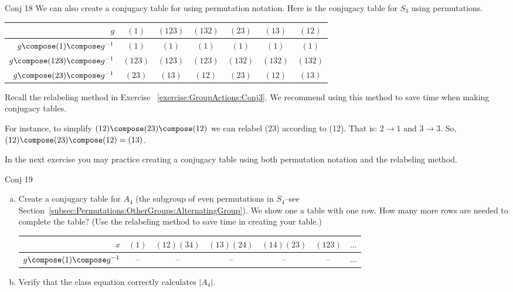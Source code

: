 \begin{example}{Conj 18}
We can also create a conjugacy table for using permutation notation. Here is the conjugacy table for $S_3$ using permutations.
  
\begin{center}
\begin{tabular}{|r | c | c |c | c | c |c |}\hline
$g$ &$(1)$ & $(123)$ &$(132)$ & $(23)$ & $(13)$ & $(12)$\\ \hline
$g\compose (1)\compose g^{-1}$ &$(1)$ & $(1)$ & $(1)$ &$(1)$ &$(1)$ & $(1)$ \\ \hline
$ g\compose (123)\compose g^{-1}$& $(123)$&$(123)$& $(123)$&$(132)$ &$(132)$ & $(132)$\\ \hline
$g\compose(23)\compose g^{-1}$ & $(23)$ &$(13)$ & $(12)$ & $(23)$ & $(12)$ & $(13)$\\ \hline 
\end{tabular}
\end{center}

Recall the relabeling method in Exercise  ~\ref{exercise:GroupActions:Conj3}.  We recommend using this method to save time when making conjugacy tables.  

For instance, to simplify $(12)\compose (23)\compose (12)$ we can relabel (23) according to (12).  That is: $2\rightarrow 1$ and $3\rightarrow 3$.  So,  $(12)\compose (23)\compose (12)=(13)$.
\end{example}

In the next exercise you may practice creating a conjugacy table using both permutation notation and the relabeling method.

\begin{exercise}{Conj 19}
\begin{enumerate}[(a)]
\item Create a conjugacy table for $A_4$ (the subgroup of even permutations in $S_4$--see Section~\ref{subsec:Permutations:OtherGroups:AlternatingGroup}). We show one a table with one row.  How many more rows are needed to complete the  table? (Use the relabeling method to save time in creating your table.)

\begin{center}
\begin{tabular}
{|r |c| c| c| c| c|c}\hline
 $x$& $(1)$& $(12)(34)$&$(13)(24)$&$(14)(23)$&$(123)$&$\ldots$\\ \hline
$g \compose(1)\compose g^{-1}$ & -- & --& --&--&--& $\ldots$ \\ 
\end{tabular}
\end{center}

\item Verify that the class equation correctly calculates $|A_4|$.
\end {enumerate}
\end {exercise}



